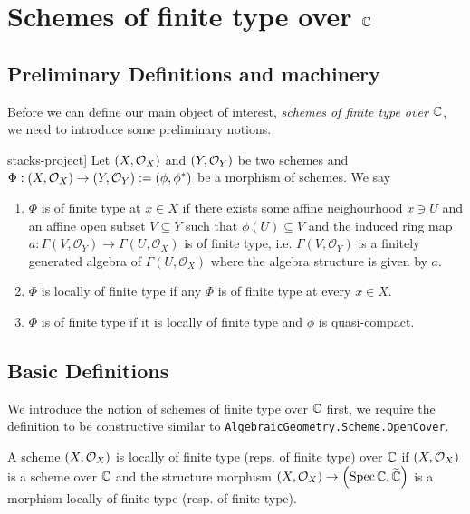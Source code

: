 \chapter{Schemes of finite type over $\mathbb{C}$}

\section{Preliminary Definitions and machinery}

Before we can define our main object of interest, {\em schemes of finite type over $\mathbb{C}$}, we need to introduce some preliminary notions.

\begin{definition}[Morphisms of scheme \cite[01T1]{stacks-project}]
Let $\left(X, \mathcal{O}_{X}\right)$ and $\left(Y, \mathcal{O}_{Y}\right)$ be two schemes and $\Phi : \left(X, \mathcal{O}_{X}\right) \to \left(Y, \mathcal{O}_{Y}\right) := (\phi, \phi^*)$ be a morphism of schemes. We say 
\begin{enumerate}
    \item $\Phi$ is of finite type at $x \in X$ if there exists some affine neighourhood $x \ni U$ and an affine open subset $V \subseteq Y$ such that $\phi(U) \subseteq V$ and the induced ring map $a: \Gamma(V, \mathcal{O}_Y) \to \Gamma(U, \mathcal{O}_X)$ is of finite type, i.e. $\Gamma(V, \mathcal{O}_Y)$ is a finitely generated algebra of $\Gamma(U, \mathcal{O}_X)$ where the algebra structure is given by $a$.
    \item $\Phi$ is locally of finite type if any $\Phi$ is of finite type at every $x \in X$.
    \item $\Phi$ is of finite type if it is locally of finite type and $\phi$ is quasi-compact.
\end{enumerate}
\end{definition}

\section{Basic Definitions}

We introduce the notion of schemes of finite type over $\mathbb{C}$ first, we require the definition to be constructive similar
to {\tt AlgebraicGeometry.Scheme.OpenCover}.
\begin{definition}\label{def:SchemeLocallyOfFiniteType}
    A scheme $\left(X, \mathcal{O}_{X}\right)$ is locally of finite type (reps. of finite type) over $\mathbb{C}$ if $\left(X, \mathcal{O}_{X}\right)$ is a scheme over $\mathbb{C}$ and the structure morphism $\left(X, \mathcal{O}_{X}\right) \to \left(\operatorname*{Spec}{\mathbb{C}}, \widetilde{\mathbb{C}}\right)$ is a morphism locally of finite type (resp. of finite type). 
\end{definition}

